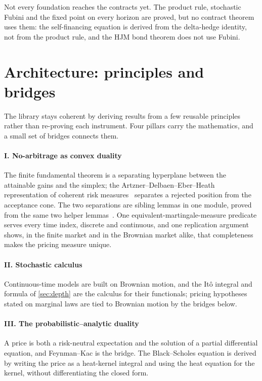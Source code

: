\documentclass[11pt]{article}
\begin{document}
Not every foundation reaches the contracts yet. The product rule, stochastic Fubini and the fixed point on every horizon
are proved, but no contract theorem uses them: the self-financing equation is derived from the delta-hedge identity, not
from the product rule, and the HJM bond theorem does not use Fubini.

\section{Architecture: principles and bridges}\label{sec:architecture}

The library stays coherent by deriving results from a few reusable principles rather than re-proving each instrument.
Four pillars carry the mathematics, and a small set of bridges connects them.

\paragraph{I. No-arbitrage as convex duality}
The finite fundamental theorem is a separating hyperplane between the attainable gains and the simplex; the
Artzner--Delbaen--Eber--Heath representation of coherent risk measures~\cite{ADEH1999} separates a rejected position from
the acceptance cone. The two separations are sibling lemmas in one module, proved from the same two helper
lemmas~\cite{CoelhoFTAP}. One equivalent-martingale-measure predicate serves every time index, discrete and continuous,
and one replication argument shows, in the finite market and in the Brownian market alike, that completeness makes the
pricing measure unique.

\paragraph{II. Stochastic calculus}
Continuous-time models are built on Brownian motion, and the It\^o integral and formula of \cref{sec:depth} are the
calculus for their functionals; pricing hypotheses stated on marginal laws are tied to Brownian motion by the bridges
below.

\paragraph{III. The probabilistic--analytic duality}
A price is both a risk-neutral expectation and the solution of a partial differential equation, and Feynman--Kac is the
bridge. The Black--Scholes equation is derived by writing the price as a heat-kernel integral and using the heat equation
for the kernel, without differentiating the closed form.
\end{document}

